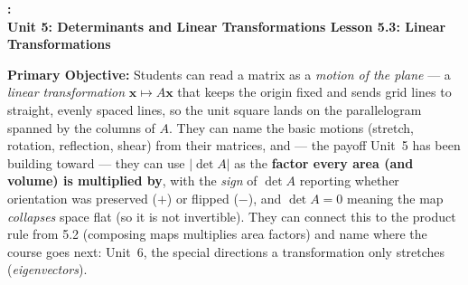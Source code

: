 \documentclass[10pt]{article}
\newcommand{\xx}{\mathbf{x}}
\newcommand{\UnitNumberName}{Unit 5: Determinants and Linear Transformations \quad}
\newcommand{\LessonNumberName}{Lesson 5.3: Linear Transformations}
\begin{document}
\begin{center}
    {\Large\bfseries \CourseName: \SchoolYear \\
    {\small\bfseries \UnitNumberName \LessonNumberName}}
\end{center}

\begin{tcolorbox}[colback=blush, colframe=burgundy, boxrule=0.9pt, arc=2mm,
    left=2mm, right=2mm, top=1.5mm, bottom=1.5mm]
    \textbf{Primary Objective:} Students can read a matrix as a \emph{motion of the plane} --- a
    \emph{linear transformation} $\xx\mapsto A\xx$ that keeps the origin fixed and sends grid lines to
    straight, evenly spaced lines, so the unit square lands on the parallelogram spanned by the columns
    of $A$. They can name the basic motions (stretch, rotation, reflection, shear) from their matrices,
    and --- the payoff Unit~5 has been building toward --- they can use $|\det A|$ as the \textbf{factor
    every area (and volume) is multiplied by}, with the \emph{sign} of $\det A$ reporting whether
    orientation was preserved ($+$) or flipped ($-$), and $\det A=0$ meaning the map \emph{collapses}
    space flat (so it is not invertible). They can connect this to the product rule from 5.2 (composing
    maps multiplies area factors) and name where the course goes next: Unit~6, the special directions a
    transformation only stretches (\emph{eigenvectors}).
\end{tcolorbox}
\end{document}

